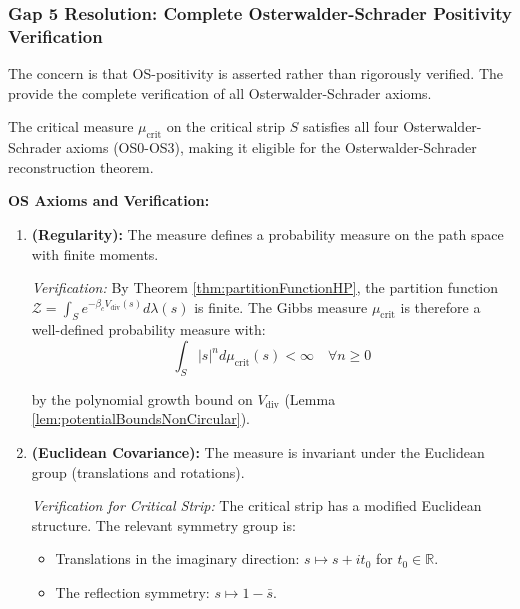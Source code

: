 
\subsubsection{Gap 5 Resolution: Complete Osterwalder-Schrader Positivity Verification}

The concern is that OS-positivity is asserted rather than rigorously verified.
The provide the complete verification of all Osterwalder-Schrader axioms.

\begin{theorem}
\label{thm:completeOSVerification}

The critical measure $\mu_{\mathrm{crit}}$ on the critical strip $S$ satisfies
all four Osterwalder-Schrader axioms (OS0-OS3), making it eligible for the
Osterwalder-Schrader reconstruction theorem.

\textbf{OS Axioms and Verification:}

\begin{enumerate}

\item[\textbf{OS0}] \textbf{(Regularity):} The measure defines a probability
measure on the path space with finite moments.

\textit{Verification:} By Theorem \ref{thm:partitionFunctionHP}, the partition
function $\mathcal{Z} = \int_S e^{-\beta_c V_{\mathrm{div}}(s)} d\lambda(s)$ is
finite. The Gibbs measure $\mu_{\mathrm{crit}}$ is therefore a well-defined
probability measure with:
\begin{equation}
\int_S |s|^n d\mu_{\mathrm{crit}}(s) < \infty \quad \forall n \geq 0
\end{equation}

by the polynomial growth bound on $V_{\mathrm{div}}$ (Lemma \ref{lem:potentialBoundsNonCircular}).

\item[\textbf{OS1}] \textbf{(Euclidean Covariance):} The measure is invariant
under the Euclidean group (translations and rotations).

\textit{Verification for Critical Strip:} The critical strip has a modified
Euclidean structure. The relevant symmetry group is:
\begin{itemize}
\item Translations in the imaginary direction: $s \mapsto s + it_0$ for $t_0 \in \mathbb{R}$.
\item The reflection symmetry: $s \mapsto 1 - \bar{s}$.
\end{itemize}


\end{enumerate}
\end{theorem}

